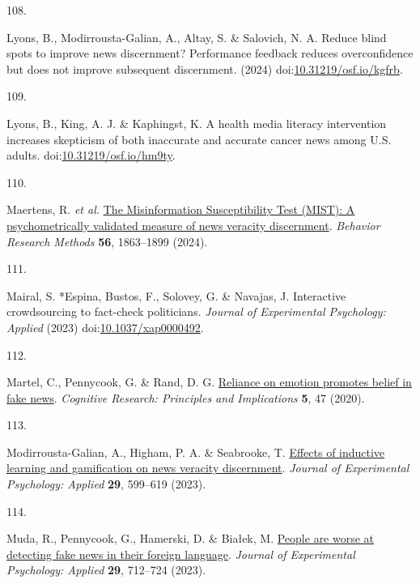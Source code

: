 \documentclass[
  man]{apa6}
\newlength{\cslhangindent}
\newlength{\csllabelwidth}
\newenvironment{CSLReferences}[2] %
 {\begin{list}{}{%
  \setlength{\itemindent}{0pt}
  \setlength{\leftmargin}{0pt}
  \setlength{\parsep}{0pt}
  \ifodd #1
   \setlength{\leftmargin}{\cslhangindent}
   \setlength{\itemindent}{-1\cslhangindent}
  \fi
  \setlength{\itemsep}{#2\baselineskip}}}
 {\end{list}}
\newcommand{\CSLLeftMargin}[1]{\parbox[t]{\csllabelwidth}{\strut#1\strut}}
\newcommand{\CSLRightInline}[1]{\parbox[t]{\linewidth - \csllabelwidth}{\strut#1\strut}}
\begin{document}
\begin{CSLReferences}{0}{0}
\CSLLeftMargin{108. }%
\CSLRightInline{*Lyons, B., Modirrousta-Galian, A., Altay, S. \& Salovich, N. A. Reduce blind spots to improve news discernment? Performance feedback reduces overconfidence but does not improve subsequent discernment. (2024) doi:\href{https://doi.org/10.31219/osf.io/kgfrb}{10.31219/osf.io/kgfrb}.}

\CSLLeftMargin{109. }%
\CSLRightInline{*Lyons, B., King, A. J. \& Kaphingst, K. A health media literacy intervention increases skepticism of both inaccurate and accurate cancer news among U.S. adults. doi:\href{https://doi.org/10.31219/osf.io/hm9ty}{10.31219/osf.io/hm9ty}.}

\CSLLeftMargin{110. }%
\CSLRightInline{*Maertens, R. \emph{et al.} \href{https://doi.org/10.3758/s13428-023-02124-2}{The Misinformation Susceptibility Test (MIST): A psychometrically validated measure of news veracity discernment}. \emph{Behavior Research Methods} \textbf{56}, 1863--1899 (2024).}

\CSLLeftMargin{111. }%
\CSLRightInline{Mairal, S. *Espina, Bustos, F., Solovey, G. \& Navajas, J. Interactive crowdsourcing to fact-check politicians. \emph{Journal of Experimental Psychology: Applied} (2023) doi:\href{https://doi.org/10.1037/xap0000492}{10.1037/xap0000492}.}

\CSLLeftMargin{112. }%
\CSLRightInline{*Martel, C., Pennycook, G. \& Rand, D. G. \href{https://doi.org/10.1186/s41235-020-00252-3}{Reliance on emotion promotes belief in fake news}. \emph{Cognitive Research: Principles and Implications} \textbf{5}, 47 (2020).}

\CSLLeftMargin{113. }%
\CSLRightInline{*Modirrousta-Galian, A., Higham, P. A. \& Seabrooke, T. \href{https://doi.org/10.1037/xap0000458}{Effects of inductive learning and gamification on news veracity discernment}. \emph{Journal of Experimental Psychology: Applied} \textbf{29}, 599--619 (2023).}

\CSLLeftMargin{114. }%
\CSLRightInline{*Muda, R., Pennycook, G., Hamerski, D. \& Białek, M. \href{https://doi.org/10.1037/xap0000475}{People are worse at detecting fake news in their foreign language}. \emph{Journal of Experimental Psychology: Applied} \textbf{29}, 712--724 (2023).}


\end{CSLReferences}
\end{document}
